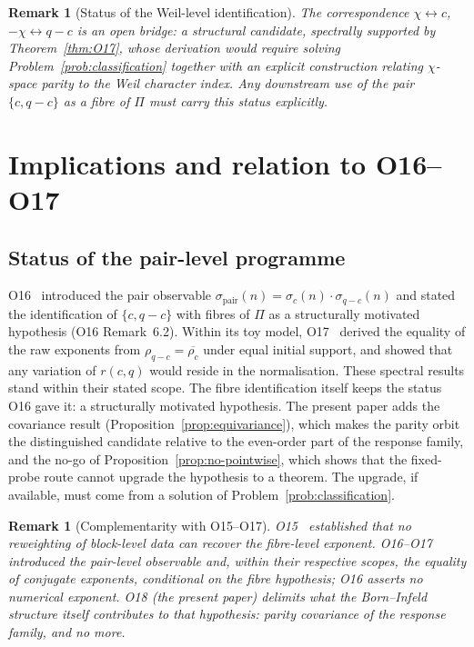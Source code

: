 \documentclass[11pt,a4paper]{article}
\newtheorem{remark}[theorem]{Remark}
\newcommand{\Proj}{\Pi}
\newcommand{\chifield}{\chi}
\newcommand{\rhoc}{\rho_{c}}
\newcommand{\rhoqc}{\rho_{q-c}}
\begin{document}
    \begin{remark}[Status of the Weil-level identification]
      \label{rem:identification}
      The correspondence $\chifield \leftrightarrow c$, $-\chifield \leftrightarrow q-c$ is
      an open bridge: a structural candidate, spectrally supported by
      Theorem~\ref{thm:O17}, whose derivation would require solving
      Problem~\ref{prob:classification} together with an explicit construction relating
      $\chifield$-space parity to the Weil character index.
      Any downstream use of the pair $\{c,q-c\}$ as a fibre of $\Proj$ must carry this
      status explicitly.
    \end{remark}

  \section{Implications and relation to O16--O17}
  \label{sec:implications}

  \subsection{Status of the pair-level programme}
    \label{ssec:requalification}

    O16~\cite{Beau2026a20} introduced the pair observable $\sigma_{\mathrm{pair}}(n) =
  \sigma_c(n) \cdot \sigma_{q-c}(n)$ and stated the identification of $\{c, q-c\}$ with
    fibres of $\Proj$ as a structurally motivated hypothesis (O16 Remark~6.2).
    Within its toy model, O17~\cite{Beau2026a21} derived the equality of the raw exponents from
    $\rhoqc = \overline{\rhoc}$ under equal initial support, and showed that any variation of
    $r(c,q)$ would reside in the normalisation.
    These spectral results stand within their stated scope.
    The fibre identification itself keeps the status O16 gave it: a structurally motivated
    hypothesis.
    The present paper adds the covariance result (Proposition~\ref{prop:equivariance}),
    which makes the parity orbit the distinguished candidate relative to the even-order
    part of the response family, and the no-go of
    Proposition~\ref{prop:no-pointwise}, which shows that the fixed-probe route cannot
    upgrade the hypothesis to a theorem.
    The upgrade, if available, must come from a solution of
    Problem~\ref{prob:classification}.

    \begin{remark}[Complementarity with O15--O17]
O15~\cite{Beau2026a19} established that no reweighting of block-level data can recover
the fibre-level exponent.
O16--O17 introduced the pair-level observable and, within their respective scopes, the equality
of conjugate exponents, conditional on the fibre hypothesis; O16 asserts no numerical exponent.
O18 (the present paper) delimits what the Born--Infeld structure itself contributes to
that hypothesis: parity covariance of the response family, and no more.
    \end{remark}
\end{document}
